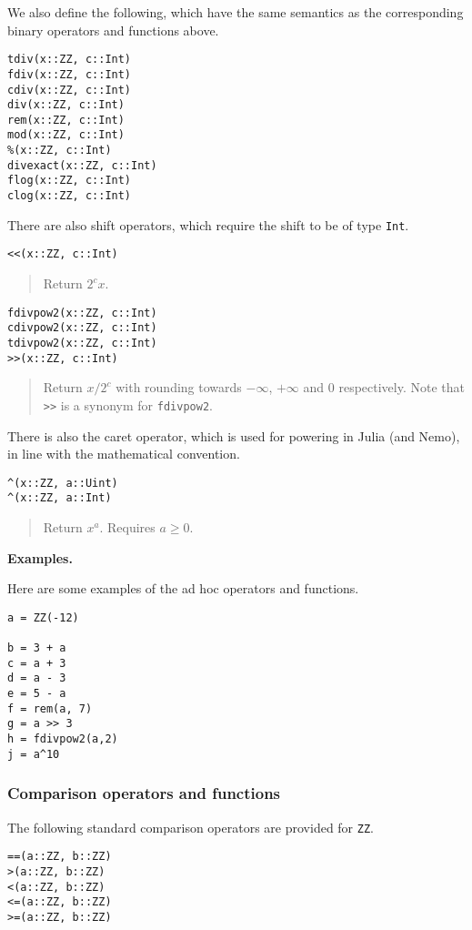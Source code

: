\documentclass[a4paper,10pt]{article}
\newcommand{\code}{\lstinline}
\newcommand{\desc}[1]{\vspace{-3mm}\begin{quote}#1\end{quote}}
\begin{document}
{{{We also define the following, which have the same semantics as the corresponding
binary operators and functions above.

\begin{lstlisting}
tdiv(x::ZZ, c::Int)
fdiv(x::ZZ, c::Int)
cdiv(x::ZZ, c::Int)
div(x::ZZ, c::Int)
rem(x::ZZ, c::Int)
mod(x::ZZ, c::Int)
%(x::ZZ, c::Int)
divexact(x::ZZ, c::Int)
flog(x::ZZ, c::Int)
clog(x::ZZ, c::Int)
\end{lstlisting}

There are also shift operators, which require the shift to be of type \code{Int}.

\begin{lstlisting}
<<(x::ZZ, c::Int)
\end{lstlisting}

\desc{Return $2^c x$.}

\begin{lstlisting}
fdivpow2(x::ZZ, c::Int)
cdivpow2(x::ZZ, c::Int)
tdivpow2(x::ZZ, c::Int)
>>(x::ZZ, c::Int)
\end{lstlisting}

\desc{Return $x/2^c$ with rounding towards $-\infty$, $+\infty$ and $0$ respectively. 
Note that \code{>>} is a synonym for \code{fdivpow2}.}

There is also the caret operator, which is used for powering in Julia (and Nemo), in
line with the mathematical convention.

\begin{lstlisting}
^(x::ZZ, a::Uint)
^(x::ZZ, a::Int)
\end{lstlisting}

\desc{Return $x^a$. Requires $a \geq 0$.}

\textbf{Examples.}

Here are some examples of the ad hoc operators and functions.

\begin{lstlisting}
a = ZZ(-12)

b = 3 + a
c = a + 3
d = a - 3
e = 5 - a
f = rem(a, 7)
g = a >> 3
h = fdivpow2(a,2)
j = a^10
\end{lstlisting}

\subsubsection{Comparison operators and functions}

The following standard comparison operators are provided for \code{ZZ}.

\begin{lstlisting}
==(a::ZZ, b::ZZ)
>(a::ZZ, b::ZZ)
<(a::ZZ, b::ZZ)
<=(a::ZZ, b::ZZ)
>=(a::ZZ, b::ZZ)
\end{lstlisting}

}}}
\end{document}
